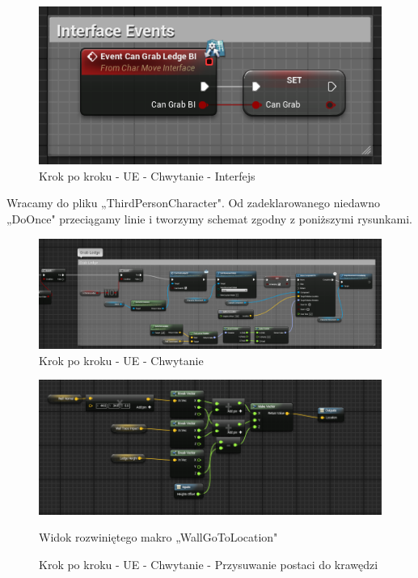 \documentclass[12pt]{xmgr}
\begin{document}
\begin{figure}[!htb]
    \begin{center}
    \includegraphics[scale=0.5]{Screeny/UeKrokPoKroku/CanGrabInterface}
    \end{center}
    \caption{Krok po kroku - UE - Chwytanie - Interfejs}
\end{figure}

\newpage
Wracamy do pliku „ThirdPersonCharacter". Od zadeklarowanego niedawno „DoOnce" przeciągamy linie i tworzymy schemat zgodny z poniższymi rysunkami.

\begin{figure}[!htb]
    \begin{center}
    \includegraphics[scale=0.5]{Screeny/UeKrokPoKroku/GrabLedge}
    \end{center}
    \caption{Krok po kroku - UE - Chwytanie}
\end{figure}

\begin{figure}[!htb]
    \begin{center}
    \includegraphics[scale=0.5]{Screeny/UeKrokPoKroku/WallGoToLocation}
    \end{center}
    \caption{Krok po kroku - UE - Chwytanie - Przysuwanie postaci do krawędzi}
    Widok rozwiniętego makro „WallGoToLocation"
\end{figure}
\end{document}
